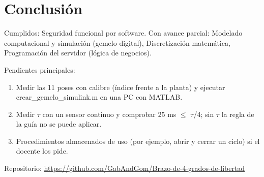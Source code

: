 \documentclass[a4paper,11pt]{article}
\begin{document}
\section{Conclusión}
Cumplidos: Seguridad funcional por software. Con avance parcial: Modelado computacional y simulación (gemelo digital), Discretización matemática, Programación del servidor (lógica de negocios).
\par\smallskip Pendientes principales:
\begin{enumerate}
\item Medir las 11 poses con calibre (índice frente a la planta) y ejecutar crear\_gemelo\_simulink.m en una PC con MATLAB.
\item Medir $\tau$ con un sensor continuo y comprobar 25 ms $\le$ $\tau$/4; sin $\tau$ la regla de la guía no se puede aplicar.
\item Procedimientos almacenados de uso (por ejemplo, abrir y cerrar un ciclo) si el docente los pide.
\end{enumerate}
\par\smallskip\noindent Repositorio: \url{https://github.com/GabAndGom/Brazo-de-4-grados-de-libertad}
\end{document}
